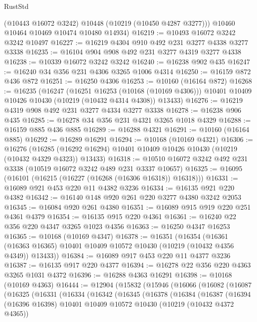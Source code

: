 \begin{lexlean}{RustStd}
\begin{coremodule}
        (@10443 @16072 @3242)
        @10448
        (@10219 (@10450 @4287 @3277)))
      @10460
      @10464
      @10469
      @10474
      @10480
      @14934)
@16219 := @10493 @16072 @3242 @3242 @10497
@16227 := @16219 @4304 @910 @492 @231 @3277 @4338 @3277 @3338
@16235 := @16104 @904 @908 @492 @231 @3277 @4319 @3277 @4338
@16238 := @10339 @16072 @3242 @3242
@16240 := @16238 @902 @435
@16247 := @16240 @34 @356 @231 @4306 @3265 @1006 @4314
@16250 := @16159 @872 @436 @872
@16251 := @16250 @4306
@16253 := @10160 (@16164 @872)
@16268 := @16235
    (@16247
      (@16251 @16253 (@10168 (@10169 @4306)))
      @10401
      @10409
      @10426
      @10430
      (@10219 (@10432 @4314 @4308))
      @13433)
@16276 := @16219 @4319 @908 @492 @231 @3277 @4334 @3277 @3338
@16278 := @16238 @906 @435
@16285 := @16278 @34 @356 @231 @4321 @3265 @1018 @4329
@16288 := @16159 @885 @436 @885
@16289 := @16288 @4321
@16291 := @10160 (@16164 @885)
@16292 := @16289 @16291
@16294 := @10168 (@10169 @4321)
@16306 := @16276
    (@16285 (@16292 @16294) @10401 @10409 @10426 @10430 (@10219 (@10432 @4329 @4323)) @13433)
@16318 := @10510 @16072 @3242 @492 @231 @3338 (@10519 @16072 @3242 @489 @231 @3337 @10657)
@16325 := @16095 (@16101 (@16215 (@16227 (@16268 (@16306 @16318)) @16318)))
@16331 := @16089 @921 @453 @220 @11 @4382 @3236
@16334 := @16135 @921 @220 @4382
@16342 := @16140 @148 @920 @261 @220 @3277 @4380 @3242 @2053
@16345 := @16084 @920 @261 @4380
@16351 := @16089 @915 @919 @220 @251 @4361 @4379
@16354 := @16135 @915 @220 @4361
@16361 := @16240 @22 @356 @220 @4347 @3265 @1023 @4356
@16363 := @16250 @4347 @16253
@16365 := @10168 (@10169 @4347)
@16378 := @16351
    (@16354
      (@16361 (@16363 @16365) @10401 @10409 @10572 @10430 (@10219 (@10432 @4356 @4349)) @13433))
@16384 := @16089 @917 @453 @220 @11 @4377 @3236
@16387 := @16135 @917 @220 @4377
@16394 := @16278 @22 @356 @220 @4363 @3265 @1031 @4372
@16396 := @16288 @4363 @16291
@16398 := @10168 (@10169 @4363)
@16444 := @12904
    (@15832
      (@15946
        (@16066
          (@16082
            (@16087
              (@16325
                (@16331
                  (@16334
                    (@16342
                      (@16345
                        (@16378
                          (@16384
                            (@16387
                              (@16394
                                (@16396 @16398)
                                @10401
                                @10409
                                @10572
                                @10430
                                (@10219 (@10432 @4372 @4365))

\end{coremodule}
\end{lexlean}
